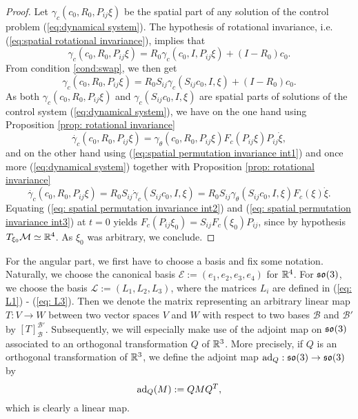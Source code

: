 \begin{proof}
Let $\gamma_c(c_0, R_0, P_{ij} \xi)$ be the spatial part of any solution of the control problem (\ref{eq:dynamical system}). The hypothesis of rotational invariance, i.e. (\ref{eq:spatial rotational invariance}), implies that
\begin{equation}
	\gamma_c(c_0, R_0, P_{ij} \xi) = R_0 \gamma_c(c_0, I, P_{ij} \xi) + (I - R_0)c_0.
\end{equation}
From condition \ref{cond:swap}, we then get
\begin{equation}
\label{eq:spatial permutation invariance int1}
	\gamma_c(c_0, R_0, P_{ij}\xi) = R_0 S_{ij} \gamma_c(S_{ij} c_0, I, \xi) + (I - R_0)c_0.
\end{equation}
As both $\gamma_c(c_0, R_0, P_{ij} \xi)$ and $\gamma_c(S_{ij} c_0, I, \xi)$ are spatial parts of solutions of the control system (\ref{eq:dynamical system}), we have on the one hand using Proposition \ref{prop: rotational invariance}
\begin{equation}
\label{eq: spatial permutation invariance int2}
	\dot{\gamma_c}(c_0, R_0, P_{ij} \xi) = \gamma_{\theta}(c_0, R_0, P_{ij} \xi) F_c(P_{ij} \xi) P_{ij} \dot{\xi},
\end{equation}
and on the other hand using (\ref{eq:spatial permutation invariance int1}) and once more (\ref{eq:dynamical system}) together with Proposition \ref{prop: rotational invariance}
\begin{equation}
\label{eq: spatial permutation invariance int3}
	\dot{\gamma_c}(c_0, R_0, P_{ij} \xi) = R_0 S_{ij} \dot{\gamma}_c(S_{ij} c_0, I, \xi) = R_0 S_{ij} \gamma_\theta(S_{ij} c_0, I, \xi) F_c(\xi) \dot{\xi}.
\end{equation}
Equating (\ref{eq: spatial permutation invariance int2}) and (\ref{eq: spatial permutation invariance int3}) at $t = 0$ yields $ F_c(P_{ij} \xi_0) = S_{ij} F_c(\xi_0) P_{ij}$, since by hypothesis $T_{\xi_0} \mathcal{M} \simeq \mathbb{R}^4$. As $\xi_0$ was arbitrary, we conclude.
\end{proof}

For the angular part, we first have to choose a basis and fix some notation. Naturally, we choose the canonical basis $\mathcal{E} := (e_1, e_2, e_3, e_4)$ for $\mathbb{R}^4$. For $\mathfrak{so}(3)$, we choose the basis $\mathcal{L} := (L_1, L_2, L_3)$, where the matrices $L_i$ are defined in (\ref{eq: L1}) - (\ref{eq: L3}). Then we denote the matrix representing an arbitrary linear map $T: V \to W$ between two vector spaces $V$ and $W$ with respect to two bases $\mathcal{B}$ and $\mathcal{B}'$ by $[T]_{\mathcal{B}}^{\mathcal{B}'}$. Subsequently, we will especially make use of the adjoint map on $\mathfrak{so}(3)$ associated to an orthogonal transformation $Q$ of $\mathbb{R}^3$. More precisely, if $Q$ is an orthogonal transformation of $\mathbb{R}^3$, we define the adjoint map $\operatorname{ad}_Q : \mathfrak{so}(3) \to \mathfrak{so}(3)$ by
\begin{equation}
\operatorname{ad}_Q(M) := Q M Q^T,
\end{equation}
which is clearly a linear map.

